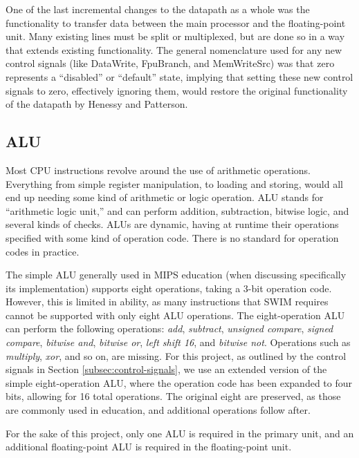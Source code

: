 \documentclass[
    paper=letter,
    parskip=half,
    fontsize=12pt,
    titlepage=firstiscover,
    toc=bibliography,
    numbers=endperiod
]{scrartcl}
\begin{document}
One of the last incremental changes to the datapath as a whole was the
functionality to transfer data between the main processor and the
floating-point unit. Many existing lines must be split or multiplexed,
but are done so in a way that extends existing functionality. The
general nomenclature used for any new control signals (like DataWrite,
FpuBranch, and MemWriteSrc) was that zero represents a ``disabled'' or
``default'' state, implying that setting these new control signals to
zero, effectively ignoring them, would restore the original
functionality of the datapath by Henessy and Patterson.

\subsection{ALU}

Most CPU instructions revolve around the use of arithmetic operations.
Everything from simple register manipulation, to loading and storing,
would all end up needing some kind of arithmetic or logic operation. ALU
stands for ``arithmetic logic unit,'' and can perform addition,
subtraction, bitwise logic, and several kinds of checks. ALUs are
dynamic, having at runtime their operations specified with some kind of
operation code. There is no standard for operation codes in practice.

The simple ALU generally used in MIPS education (when discussing
specifically its implementation) supports eight operations, taking a
3-bit operation code. However, this is limited in ability, as many
instructions that SWIM requires cannot be supported with only eight ALU
operations. The eight-operation ALU can perform the following
operations: \emph{add}, \emph{subtract}, \emph{unsigned compare},
\emph{signed compare}, \emph{bitwise and}, \emph{bitwise or}, \emph{left
    shift 16}, and \emph{bitwise not}. Operations such as \emph{multiply},
\emph{xor}, and so on, are missing. For this project, as outlined by the
control signals in Section \ref{subsec:control-signals}, we use an
extended version of the simple eight-operation ALU, where the operation
code has been expanded to four bits, allowing for 16 total operations.
The original eight are preserved, as those are commonly used in
education, and additional operations follow after.

For the sake of this project, only one ALU is required in the primary
unit, and an additional floating-point ALU is required in the
floating-point unit.
\end{document}
